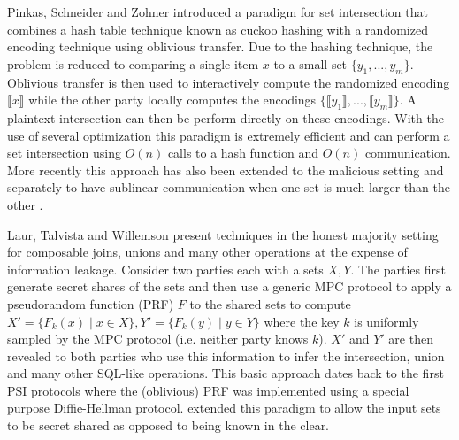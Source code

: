 Pinkas, Schneider and Zohner \cite{usenix:PSZ14} introduced a paradigm for set intersection that combines a hash table technique known as cuckoo hashing with a randomized encoding technique using oblivious transfer. Due to the hashing technique, the problem is reduced to comparing a single item $x$ to a small set $\{y_1,...,y_m\}$. Oblivious transfer is then used to interactively compute the randomized encoding $\llbracket x\rrbracket$ while the other party locally computes the encodings $\{\llbracket y_1\rrbracket,...,\llbracket y_m\rrbracket \}$. A plaintext intersection can then be perform directly on these encodings. With the use of several optimization\cite{USENIX:PSSZ15,PSZ16,CCS:KKRT16,OOS17} this paradigm is extremely efficient and can perform a set intersection using $O(n)$ calls to a hash function and $O(n)$ communication. 
\iffullversion
More recently this approach has also been extended to the malicious setting \cite{CCS:RinRos17} and separately to have sublinear communication when one set is much larger than the other\cite{CLR17} .
\fi


Laur, Talvista and Willemson\cite{LTW13} present techniques in the honest majority setting for composable joins, unions and  many other operations at the expense of information leakage. Consider two parties each with a sets $X,Y$. The parties first generate secret shares of the sets and then use a generic MPC protocol to apply a pseudorandom function (PRF) $F$ to the shared sets to compute $X' = \{F_k(x) \mid x\in X\}, Y'=\{F_k(y) \mid y\in Y\}$ where the key $k$ is uniformly sampled by the MPC protocol (i.e. neither party knows $k$). $X'$ and $Y'$ are then revealed to both parties who use this information to infer the intersection, union and many other SQL-like operations. This basic approach dates back to the first PSI protocols \cite{Mea86,HFH99} where the (oblivious) PRF was implemented using a special purpose Diffie-Hellman protocol. \cite{LTW13} extended this paradigm to allow the input sets to be secret shared as opposed to being known in the clear.

